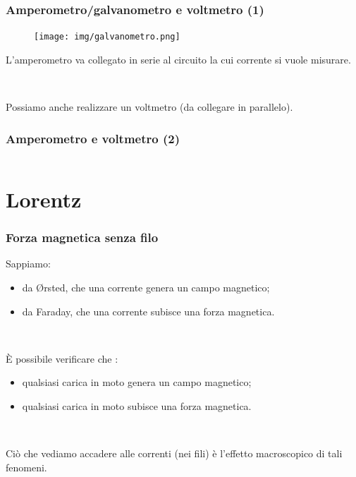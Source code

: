 \documentclass[]{beamer}
\theoremstyle{plain}
\begin{document}
\begin{frame}
\frametitle{Amperometro/galvanometro e voltmetro (1)}
\begin{figure}
\texttt{[image: img/galvanometro.png]}
\end{figure}
L'amperometro va collegato \alert<1>{in serie} al circuito la cui corrente si vuole misurare.\pause

~

Possiamo anche realizzare un voltmetro (da collegare \alert<2>{in parallelo}).
\end{frame}

\begin{frame}
\frametitle{Amperometro e voltmetro (2)}
\begin{columns}
\begin{column}{0.4\textwidth}
\end{column}
\begin{column}{0.4\textwidth}
\end{column}
\end{columns}
\end{frame}



\section{Lorentz}

\begin{frame}
\frametitle{Forza magnetica senza filo}
Sappiamo:
\begin{itemize}
  \item da \O rsted, che \alert<1>{una corrente genera un campo magnetico};\pause
  \item da Faraday, che \alert<2>{una corrente subisce una forza magnetica}.\pause
\end{itemize}

~

È possibile verificare che :
\begin{itemize}
  \item \alert<3>{qualsiasi carica in moto genera un campo magnetico};\pause
  \item \alert<4>{qualsiasi carica in moto subisce una forza magnetica}.\pause
\end{itemize}

~

Ciò che vediamo accadere alle correnti (nei fili) è l'effetto macroscopico di tali fenomeni.
\end{frame}
\end{document}
